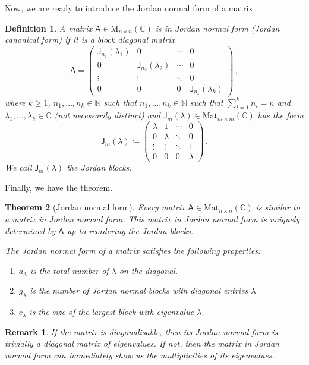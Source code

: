 \documentclass{article}
\theoremstyle{plain}\theoremheaderfont{\normalfont\itshape}\theorembodyfont{\rmfamily}\theoremseparator{.}\newtheorem*{rem}{Remark}\newtheorem*{ex}{Example}\newtheorem*{proof}{Proof}\newtheorem*{altp}{Alternative proof}
\theoremstyle{plain}\theoremheaderfont{\normalfont\bfseries}\theorembodyfont{\rmfamily}\theoremseparator{.}\newtheorem{thm}{Theorem}[section]\newtheorem{lem}[thm]{Lemma}\newtheorem{prop}[thm]{Proposition}\newtheorem*{cor}{Corollary}\newtheorem{defn}[thm]{Definition}\newtheorem{clm}[thm]{Claim}\newtheorem{clminproof}{Claim}
\theoremstyle{break}\theoremheaderfont{\normalfont\itshape}\theorembodyfont{\rmfamily}\theoremseparator{.\medskip}\newtheorem*{proofskip}{Proof}\newtheorem*{exs}{Examples}\newtheorem*{rems}{Remarks}
\theoremstyle{break}\theoremheaderfont{\normalfont\bfseries}\theorembodyfont{\rmfamily}\theoremseparator{.\medskip}\newtheorem{lemskip}[thm]{Lemma}\newtheorem{defnskip}[thm]{Definition}\newtheorem{propskip}[thm]{Proposition}\newtheorem{thmskip}[thm]{Theorem}
\numberwithin{equation}{section}
\begin{document}
	Now, we are ready to introduce the Jordan normal form of a matrix.
	\begin{defn}
		A matrix \(\mathsf{A}\in\mathrm{M}_{n\times n}(\mathbb{C})\) is in \textit{Jordan normal form} (\textit{Jordan canonical form}) if it is a block diagonal matrix
		\[\mathsf{A}=\begin{pmatrix}
			\mathsf{J}_{n_1}(\lambda_1) & 0 & \cdots & 0\\
			0 & \mathsf{J}_{n_2}(\lambda_2) & \cdots & 0\\
			\vdots & \vdots & \ddots & 0\\
			0 & 0 & 0 & \mathsf{J}_{n_k}(\lambda_k)
		\end{pmatrix}\,,\]
		where \(k\ge 1\), \(n_1,\dots,n_k\in\mathbb{N}\) such that \(n_1,\dots,n_k\in\mathbb{N}\) such that \(\sum_{i=1}^{k}n_i=n\) and \(\lambda_1,\dots,\lambda_k\in\mathbb{C}\) (not necessarily distinct) and \(\mathsf{J}_{m}(\lambda)\in\mathrm{Mat}_{m\times m}(\mathbb{C})\) has the form
		\[\mathsf{J}_m(\lambda)\coloneqq\begin{pmatrix}
			\lambda & 1 & \cdots & 0\\
			0 & \lambda & \ddots & 0\\
			\vdots & \vdots & \ddots & 1\\
			0 & 0 & 0 & \lambda
		\end{pmatrix}\,.\]
		We call \(\mathsf{J}_m(\lambda)\) the \textit{Jordan blocks}.
	\end{defn}
	Finally, we have the theorem.
	\begin{thm}[Jordan normal form]
		Every matrix \(\mathsf{A}\in\mathrm{Mat}_{n\times n}(\mathbb{C})\) is similar to a matrix in Jordan normal form. This matrix in Jordan normal form is uniquely determined by \(\mathsf{A}\) up to reordering the Jordan blocks.

		The Jordan normal form of a matrix satisfies the following properties:
		\begin{enumerate}[topsep=0pt]
			\item[(i)] \(a_\lambda\) is the total number of \(\lambda\) on the diagonal.
			\item[(ii)] \(g_\lambda\) is the number of Jordan normal blocks with diagonal entries \(\lambda\)
			\item[(iii)] \(c_\lambda\) is the size of the largest block with eigenvalue \(\lambda\). 
		\end{enumerate}
	\end{thm}
	\begin{rem}
		If the matrix is diagonalisable, then its Jordan normal form is trivially a diagonal matrix of eigenvalues. If not, then the matrix in Jordan normal form can immediately show us the multiplicities of its eigenvalues.
	\end{rem}
\end{document}

